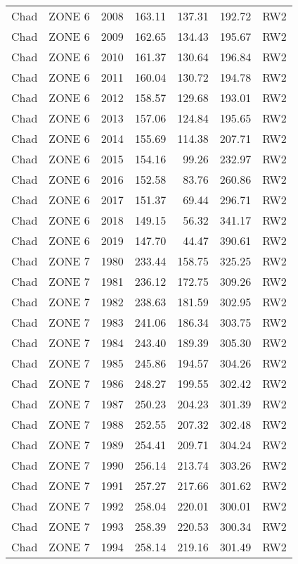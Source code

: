 \begin{longtable}{lllrrrl}
  Chad & ZONE 6 & 2008 & 163.11 & 137.31 & 192.72 & RW2 \\ 
  Chad & ZONE 6 & 2009 & 162.65 & 134.43 & 195.67 & RW2 \\ 
  Chad & ZONE 6 & 2010 & 161.37 & 130.64 & 196.84 & RW2 \\ 
  Chad & ZONE 6 & 2011 & 160.04 & 130.72 & 194.78 & RW2 \\ 
  Chad & ZONE 6 & 2012 & 158.57 & 129.68 & 193.01 & RW2 \\ 
  Chad & ZONE 6 & 2013 & 157.06 & 124.84 & 195.65 & RW2 \\ 
  Chad & ZONE 6 & 2014 & 155.69 & 114.38 & 207.71 & RW2 \\ 
  Chad & ZONE 6 & 2015 & 154.16 & 99.26 & 232.97 & RW2 \\ 
  Chad & ZONE 6 & 2016 & 152.58 & 83.76 & 260.86 & RW2 \\ 
  Chad & ZONE 6 & 2017 & 151.37 & 69.44 & 296.71 & RW2 \\ 
  Chad & ZONE 6 & 2018 & 149.15 & 56.32 & 341.17 & RW2 \\ 
  Chad & ZONE 6 & 2019 & 147.70 & 44.47 & 390.61 & RW2 \\ 
  Chad & ZONE 7 & 1980 & 233.44 & 158.75 & 325.25 & RW2 \\ 
  Chad & ZONE 7 & 1981 & 236.12 & 172.75 & 309.26 & RW2 \\ 
  Chad & ZONE 7 & 1982 & 238.63 & 181.59 & 302.95 & RW2 \\ 
  Chad & ZONE 7 & 1983 & 241.06 & 186.34 & 303.75 & RW2 \\ 
  Chad & ZONE 7 & 1984 & 243.40 & 189.39 & 305.30 & RW2 \\ 
  Chad & ZONE 7 & 1985 & 245.86 & 194.57 & 304.26 & RW2 \\ 
  Chad & ZONE 7 & 1986 & 248.27 & 199.55 & 302.42 & RW2 \\ 
  Chad & ZONE 7 & 1987 & 250.23 & 204.23 & 301.39 & RW2 \\ 
  Chad & ZONE 7 & 1988 & 252.55 & 207.32 & 302.48 & RW2 \\ 
  Chad & ZONE 7 & 1989 & 254.41 & 209.71 & 304.24 & RW2 \\ 
  Chad & ZONE 7 & 1990 & 256.14 & 213.74 & 303.26 & RW2 \\ 
  Chad & ZONE 7 & 1991 & 257.27 & 217.66 & 301.62 & RW2 \\ 
  Chad & ZONE 7 & 1992 & 258.04 & 220.01 & 300.01 & RW2 \\ 
  Chad & ZONE 7 & 1993 & 258.39 & 220.53 & 300.34 & RW2 \\ 
  Chad & ZONE 7 & 1994 & 258.14 & 219.16 & 301.49 & RW2 \\ 

\end{longtable}
